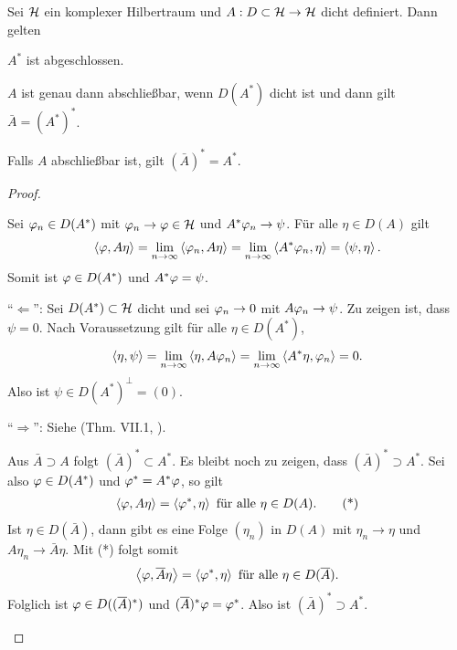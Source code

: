 \medskip %
\begin{prop}
\label{prop:4.1}
Sei $\mathcal{H}$ ein komplexer Hilbertraum und
$A : D \subset \mathcal{H} \to \mathcal{H}$ dicht definiert.
Dann gelten
\begin{propenum}
\item $A^{*}$ ist abgeschlossen.
\item
$A$ ist genau dann abschließbar, wenn $D(A^{*})$
dicht ist und dann gilt $\bar{A} = (A^{*})^{*}$.
\item
Falls $A$ abschließbar ist, gilt $\left(\bar{A}\right)^{*} = A^{*}$.
\end{propenum}
\end{prop}
\begin{proof}
\begin{proofenum}
\item Sei $\varphi_n\in D(A^*)$ mit $\varphi_n\to \varphi\in \mathcal{H}$ und $A^*\varphi_n\to \psi$.
Für alle $\eta\in D(A)$ gilt
\begin{align*}
\left\langle\varphi,A\eta\right\rangle = \lim\limits_{n\to\infty}
\left\langle\varphi_n,A\eta\right\rangle = \lim\limits_{n\to\infty} \left\langle A^*\varphi_n,\eta\right\rangle =
\left\langle\psi,\eta\right\rangle.
\end{align*}
Somit ist $\varphi\in D(A^*)$ und $A^*\varphi =\psi$.
\item ``$\Leftarrow$'': Sei $D(A^*)\subset \mathcal{H}$ dicht und sei $\varphi_n\to0$ mit
$A\varphi_n\to \psi$. Zu zeigen ist, dass $\psi=0$. Nach Voraussetzung gilt für alle
$\eta\in D(A^*)$,
\begin{align*}
\left\langle\eta,\psi\right\rangle = \lim\limits_{n\to\infty}\left\langle\eta,A\varphi_n\right\rangle = 
\lim\limits_{n\to\infty} \left\langle A^*\eta,\varphi_n\right\rangle = 0.
\end{align*}
Also ist $\psi\in D(A^*)^\bot = (0)$.

``$\Rightarrow$'': Siehe (Thm. VII.1, \cite{RS95a}).
\item Aus $\bar{A} \supset A$ folgt $(\bar{A})^* \subset A^*$. Es bleibt noch zu
zeigen, dass $(\bar{A})^* \supset A^*$. Sei also $\varphi\in D(A^*)$ und $\varphi^* =
A^*\varphi$, so gilt 
\begin{align*}
\left\langle\varphi,A\eta\right\rangle = \left\langle\varphi^*,\eta\right\rangle\text{ für alle }\eta\in D(A).\tag{*}
\end{align*}
Ist $\eta\in D(\bar{A})$, dann gibt es eine Folge $(\eta_n)$ in $D(A)$ mit
$\eta_n\to \eta$ und $A\eta_n\to \bar{A}\eta$. Mit (*) folgt somit
\begin{align*}
\left\langle\varphi,\overline{A}\eta\right\rangle = \left\langle\varphi^*,\eta\right\rangle\text{ für alle }\eta\in D(\overline{A}).
\end{align*}
Folglich ist $\varphi\in D((\overline{A})^*)$ und $(\overline{A})^*\varphi = \varphi^*$. Also ist
$(\bar{A})^*\supset A^*$.\qedhere
\end{proofenum}
\end{proof}

